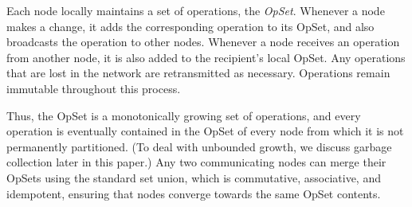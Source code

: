 Each node locally maintains a set of operations, the \emph{OpSet}.
Whenever a node makes a change, it adds the corresponding operation to its OpSet, and also broadcasts the operation to other nodes.
Whenever a node receives an operation from another node, it is also added to the recipient's local OpSet.
Any operations that are lost in the network are retransmitted as necessary.
Operations remain immutable throughout this process.

Thus, the OpSet is a monotonically growing set of operations, and every operation is eventually contained in the OpSet of every node from which it is not permanently partitioned.
(To deal with unbounded growth, we discuss garbage collection later in this paper.)
Any two communicating nodes can merge their OpSets using the standard set union, which is commutative, associative, and idempotent, ensuring that nodes converge towards the same OpSet contents.
